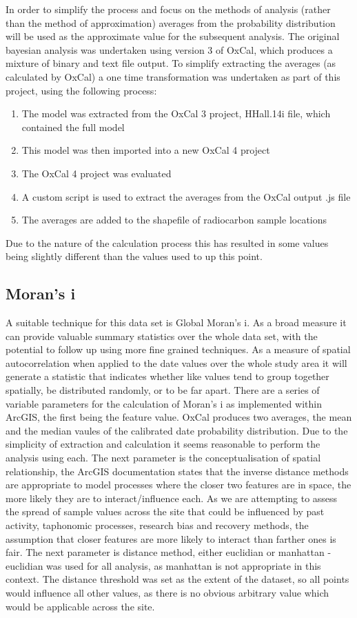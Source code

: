In order to simplify the process and focus on the methods of analysis (rather than the method of approximation) averages from the probability distribution will be used as the approximate value for the subsequent analysis. The original bayesian analysis was undertaken using version 3 of OxCal, which produces a mixture of binary and text file output. To simplify extracting the averages (as calculated by OxCal) a one time transformation was undertaken as part of this project, using the following process:
\begin{enumerate}
\item The model was extracted from the OxCal 3 project, HHall.14i file, which contained the full model
\item This model was then imported into a new OxCal 4 project 
\item The OxCal 4 project was evaluated
\item A custom script is used to extract the averages from the OxCal output .js file
\item The averages are added to the shapefile of radiocarbon sample locations
\end{enumerate}
Due to the nature of the calculation process this has resulted in some values being slightly different than the values used to up this point.

\subsection{Moran's i}
A suitable technique for this data set is Global Moran's i. As a broad measure it can provide valuable summary statistics over the whole data set, with the potential to follow up using more fine grained techniques. As a measure of spatial autocorrelation when applied to the date values over the whole study area it will generate a statistic that indicates whether like values tend to group together spatially, be distributed randomly, or to be far apart. There are a series of variable parameters for the calculation of Moran's i as implemented within ArcGIS, the first being the feature value. OxCal produces two averages, the mean and the median vaules of the calibrated date probability distribution. Due to the simplicity of extraction and calculation it seems reasonable to perform the analysis using each. The next parameter is the conceptualisation of spatial relationship, the ArcGIS documentation \protect\citep{ArcGIS:fk} states that the inverse distance methods are appropriate to model processes where the closer two features are in space, the more likely they are to interact/influence each. As we are attempting to assess the spread of sample values across the site that could be influenced by past activity, taphonomic processes, research bias and recovery methods, the assumption that closer features are more likely to interact than farther ones is fair. The next parameter is distance method, either euclidian or manhattan - euclidian was used for all analysis, as manhattan is not appropriate in this context. The distance threshold was set as the extent of the dataset, so all points would influence all other values, as there is no obvious arbitrary value which would be applicable across the site. 

